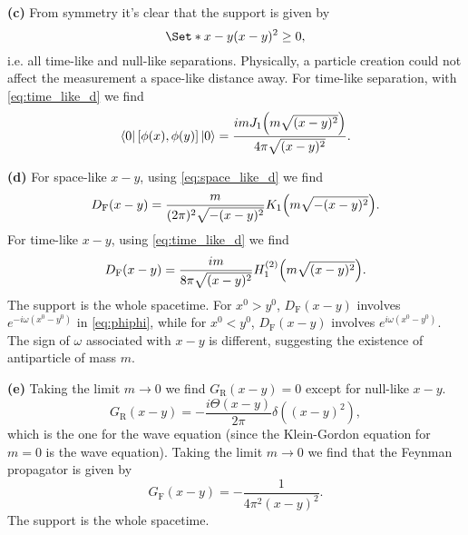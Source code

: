 \documentclass{article}
\makeatletter
\newcommand*{\shifttext}[1]{%
  \settowidth{\@tempdima}{#1}%
  \hspace{-\@tempdima}#1%
}
\newcommand{\plabel}[1]{%
\shifttext{\textbf{#1}\quad}%
}
\makeatother
\begin{document}
\plabel{(c)}%
From symmetry it's clear that the support is given by
\[ \Set*{x-y}{(x-y)^2 \ge 0}, \]
i.e. all time-like and null-like separations.
Physically, a particle creation could not affect the measurement a space-like distance away.
For time-like separation, with \cref{eq:time_like_d} we find
\[ \bra{0}[\phi(x),\phi(y)]\ket{0} = \frac{imJ_1\qty(m\sqrt{(x-y)^2})}{4\pi\sqrt{(x-y)^2}}. \]

\plabel{(d)}%
For space-like $x-y$, using \cref{eq:space_like_d} we find
\[ D_{\mathrm{F}}(x-y) = \frac{m}{(2\pi)^2 \sqrt{-(x-y)^2}} K_1\qty(m\sqrt{-(x-y)^2}). \]
For time-like $x-y$, using \cref{eq:time_like_d} we find
\[ D_{\mathrm{F}}(x-y) = \frac{im}{8\pi \sqrt{(x-y)^2}} H^{(2)}_1\qty(m\sqrt{(x-y)^2}). \]
The support is the whole spacetime.
For $x^0 > y^0$, $D_{\mathrm{F}}(x-y)$ involves $e^{-i\omega(x^0 - y^0)}$ in \cref{eq:phiphi}, while for $x^0 < y^0$, $D_{\mathrm{F}}(x-y)$ involves $e^{i\omega(x^0 - y^0)}$.
The sign of $\omega$ associated with $x-y$ is different, suggesting the existence of antiparticle of mass $m$.

\plabel{(e)}%
Taking the limit $m\rightarrow 0$ we find $G_{\mathrm{R}}(x - y) = 0$ except for null-like $x-y$.
\[ G_{\mathrm{R}}(x-y) = -\frac{i\Theta(x-y)}{2\pi}\delta((x-y)^2), \]
which is the one for the wave equation (since the Klein-Gordon equation for $m=0$ is the wave equation).
Taking the limit $m\rightarrow 0$ we find that the Feynman propagator is given by
\[ G_{\mathrm{F}}(x-y) = -\frac{1}{4\pi^2 (x-y)^2}. \]
The support is the whole spacetime.
\end{document}

